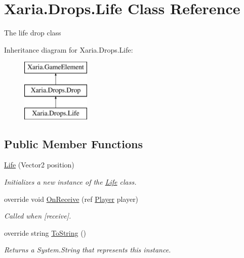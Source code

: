 \hypertarget{classXaria_1_1Drops_1_1Life}{}\section{Xaria.\+Drops.\+Life Class Reference}
\label{classXaria_1_1Drops_1_1Life}


The life drop class  


Inheritance diagram for Xaria.\+Drops.\+Life\+:\begin{figure}[H]
\begin{center}
\leavevmode
\includegraphics[height=3.000000cm]{classXaria_1_1Drops_1_1Life}
\end{center}
\end{figure}
\subsection*{Public Member Functions}
\begin{DoxyCompactItemize}
\item 
\hyperlink{classXaria_1_1Drops_1_1Life_a9d3dbca67913d57d966097f50bb748af}{Life} (Vector2 position)
\begin{DoxyCompactList}\small\item\em Initializes a new instance of the \hyperlink{classXaria_1_1Drops_1_1Life}{Life} class. \end{DoxyCompactList}\item 
override void \hyperlink{classXaria_1_1Drops_1_1Life_a17d0f9af39944213da726d821a46555b}{On\+Receive} (ref \hyperlink{classXaria_1_1Player}{Player} player)
\begin{DoxyCompactList}\small\item\em Called when \mbox{[}receive\mbox{]}. \end{DoxyCompactList}\item 
override string \hyperlink{classXaria_1_1Drops_1_1Life_aa75a0f73d72f18d4d9456c3f2a2ea0ce}{To\+String} ()
\begin{DoxyCompactList}\small\item\em Returns a System.\+String that represents this instance. \end{DoxyCompactList}\end{DoxyCompactItemize}
